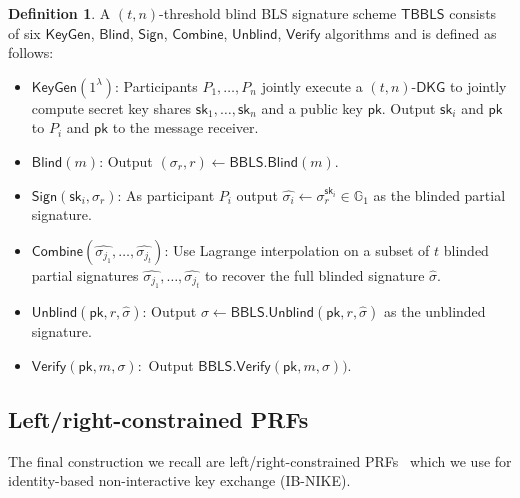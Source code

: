 \documentclass[11pt,letterpaper]{article}
\theoremstyle{definition}
\newtheorem{definition}[theorem]{Definition}
\newcommand{\GG}{\mathbb{G}}
\newcommand{\pk}{\mathsf{pk}}
\newcommand{\sk}{\mathsf{sk}}
\newcommand{\bbls}{\mathsf{BBLS}}
\newcommand{\tbbls}{\mathsf{TBBLS}}
\newcommand{\keygen}{\mathsf{KeyGen}}
\newcommand{\sign}{\mathsf{Sign}}
\newcommand{\verify}{\mathsf{Verify}}
\newcommand{\blind}{\mathsf{Blind}}
\newcommand{\unblind}{\mathsf{Unblind}}
\newcommand{\combine}{\mathsf{Combine}}
\newcommand{\dkg}{\mathsf{DKG}}
\begin{document}
\begin{definition}

  A $(t,n)$-threshold blind BLS signature scheme $\tbbls$ consists of six
  $\keygen$, $\blind$, $\sign$, $\combine$, $\unblind$, $\verify$ algorithms and
  is defined as follows:

  \begin{itemize}

    \item[] $\keygen(1^\lambda)$: Participants $P_1, \dots, P_n$ jointly execute
      a $(t,n)$-$\dkg$ to jointly compute secret key shares $\sk_1, \dots,
        \sk_n$ and a public key $\pk$. Output $\sk_i$ and $\pk$ to $P_i$ and $\pk$
      to the message receiver.

    \item[] $\blind(m)$: Output $(\sigma_r, r) \leftarrow \bbls.\blind(m)$.

    \item[] $\sign(\sk_i, \sigma_r)$: As participant $P_i$ output
      $\widehat{\sigma_i} \leftarrow \sigma_r^{\sk_i} \in \GG_1$ as the blinded
      partial signature.

    \item[] $\combine(\widehat{\sigma_{j_1}}, \dots, \widehat{\sigma_{j_t}})$:
      Use Lagrange interpolation on a subset of $t$ blinded partial signatures
      $\widehat{\sigma_{j_1}}, \dots, \widehat{\sigma_{j_t}}$ to recover the
      full blinded signature $\widehat{\sigma}$.

    \item[] $\unblind(\pk, r, \widehat{\sigma})$: Output $\sigma \leftarrow
        \bbls.\unblind(\pk, r, \widehat{\sigma})$ as the unblinded signature.

    \item[] $\verify(\pk, m, \sigma):$ Output $\bbls.\verify(\pk, m, \sigma))$.

  \end{itemize}

\end{definition}

\subsection{Left/right-constrained PRFs}

The final construction we recall are left/right-constrained
PRFs~\cite{boneh2013constrained} which we use for identity-based non-interactive
key exchange (IB-NIKE).
\end{document}
